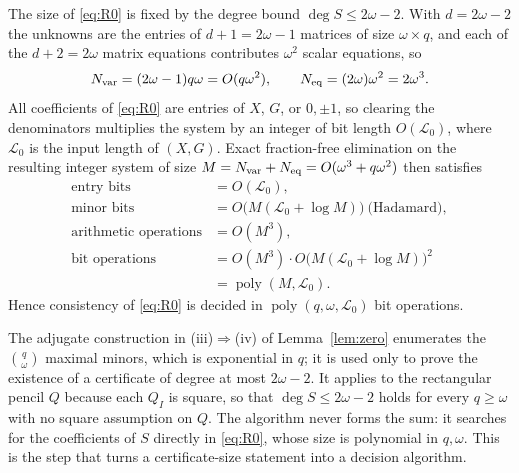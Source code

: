 The size of \eqref{eq:R0} is fixed by the degree bound $\deg S\le2\omega-2$.
With $d=2\omega-2$ the unknowns are the entries of $d+1=2\omega-1$ matrices of
size $\omega\times q$, and each of the $d+2=2\omega$ matrix equations contributes
$\omega^2$ scalar equations, so
\begin{equation*}
N_{\rm var}=(2\omega-1)q\omega=O(q\omega^2),\qquad
N_{\rm eq}=(2\omega)\omega^2=2\omega^3 .
\end{equation*}
All coefficients of \eqref{eq:R0} are entries of $X$, $G$, or $0,\pm1$, so
clearing the denominators multiplies the system by an integer of bit length
$O(\mathcal L_0)$, where $\mathcal L_0$ is the input length of $(X,G)$. Exact
fraction-free elimination on the resulting integer system of size
$M=N_{\rm var}+N_{\rm eq}=O(\omega^3+q\omega^2)$ then satisfies
\begin{equation*}
\begin{aligned}
\text{entry bits}&=O(\mathcal L_0),\\
\text{minor bits}&=O\bigl(M(\mathcal L_0+\log M)\bigr)\ \text{(Hadamard)},\\
\text{arithmetic operations}&=O(M^3),\\
\text{bit operations}&=O(M^3)\cdot O\bigl(M(\mathcal L_0+\log M)\bigr)^2\\
&=\operatorname{poly}(M,\mathcal L_0).
\end{aligned}
\end{equation*}
Hence consistency of \eqref{eq:R0} is decided in
$\operatorname{poly}(q,\omega,\mathcal L_0)$ bit operations.

\begin{remark}\label{rem:construction}
The adjugate construction in (iii)$\Rightarrow$(iv) of Lemma~\ref{lem:zero}
enumerates the $\binom q\omega$ maximal minors, which is exponential in $q$; it
is used only to prove the existence of a certificate of degree at most
$2\omega-2$. It applies to the rectangular pencil $Q$ because each $Q_I$ is
square, so that $\deg S\le2\omega-2$ holds for every $q\ge\omega$ with no square
assumption on $Q$. The algorithm never forms the sum: it searches for the
coefficients of $S$ directly in \eqref{eq:R0}, whose size is polynomial in
$q,\omega$. This is the step that turns a certificate-size statement into a
decision algorithm.
\end{remark}

